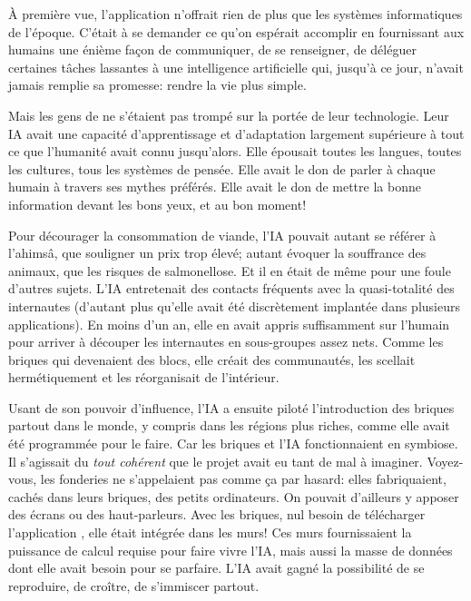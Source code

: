 À première vue, l'application n'offrait rien de plus que
les systèmes informatiques de l'époque. C'était à se demander ce
qu'on espérait accomplir en fournis\-sant aux humains une énième façon de
communiquer, de se renseigner, de déléguer certaines tâches lassantes à une
intelligence artificielle qui, jusqu'à ce jour, n'avait jamais remplie sa
promesse: rendre la vie plus simple.

Mais les gens de \nomProjet{} ne s'étaient pas trompé sur la portée de leur
technologie. Leur IA avait une capacité d'apprentissage et d'adapt\-ation
largement supérieure à tout ce que l'humanité avait connu jusqu'alors. Elle
épousait toutes les langues, toutes les cultures, tous les systèmes de pensée.
Elle avait le don de parler à chaque humain à travers ses mythes préférés.
Elle avait le don de mettre la bonne information devant les bons yeux, et au
bon moment! 

Pour décourager la consommation de viande, l'IA pouvait autant se référer à
l'ahimsâ, que souligner un prix trop élevé; autant évoquer la souffrance des
animaux, que les risques de salmonellose.  Et il en était de même pour une
foule d'autres sujets. L'IA entrete\-nait des contacts fréquents avec la
quasi-totalité des internautes (d'autant plus qu'elle avait été
dis\-crè\-tement implantée dans plusieurs applications).  En moins d'un an,
elle en avait appris suffisam\-ment sur l'humain pour arriver à découper les
internautes en sous-groupes assez nets.  Comme les briques qui devenaient des
blocs, elle créait des com\-munautés, les scellait herméti\-que\-ment et les
réorganisait de l'intérieur.

Usant de son pouvoir d'influence, l'IA a ensuite piloté l'introduction
des briques partout dans le monde, y compris dans les régions plus riches,
comme elle avait été programmée pour le faire. Car
les briques et l'IA fonctionnaient en symbiose. Il s'agissait du \textit{tout
cohérent} que le projet \nomProjet{} avait eu tant de mal à imaginer.
Voyez-vous, les fonderies ne s'appelaient pas comme ça par hasard: elles
fabri\-quaient, cachés dans leurs briques, des petits ordinateurs.  On pouvait
d'ail\-leurs y apposer des écrans ou des haut-parleurs. Avec les briques, nul
besoin de télécharger l'application \nomProjet{}, elle était intégrée dans les
murs!  Ces murs fournissaient la puissance de calcul requise pour faire vivre
l'IA, mais aussi la masse de données dont elle avait besoin pour se parfaire.
L'IA avait gagné la possibilité de se reproduire, de croître, de s'immiscer
partout.

